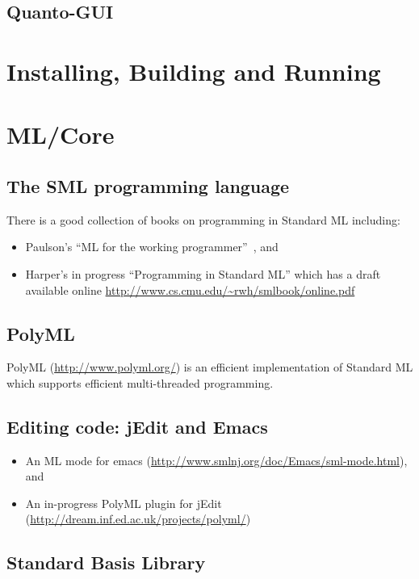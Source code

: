 \documentclass{article}
\begin{document}
\subsection{Quanto-GUI}


\section{Installing, Building and Running}


\section{ML/Core}

\subsection{The SML programming language}

There is a good collection of books on programming in Standard ML including:

\begin{itemize}
\item Paulson's ``ML for the working programmer''~\cite{Paulson:ML},
  and 
\item Harper's in progress ``Programming in Standard ML'' which has a
  draft available online
  \url{http://www.cs.cmu.edu/~rwh/smlbook/online.pdf}
\end{itemize}

\subsection{PolyML}

PolyML (\url{http://www.polyml.org/}) is an efficient implementation
of Standard ML which supports efficient multi-threaded programming. 

\subsection{Editing code: jEdit and Emacs}

\begin{itemize}
\item An ML mode for emacs
  (\url{http://www.smlnj.org/doc/Emacs/sml-mode.html}), and 
\item An in-progress PolyML plugin for jEdit
  (\url{http://dream.inf.ed.ac.uk/projects/polyml/})
\end{itemize}


\subsection{Standard Basis Library}
\end{document}
